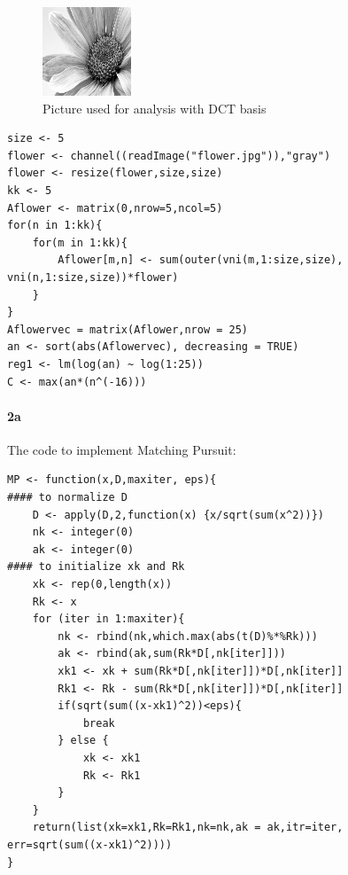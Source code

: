 \documentclass[12pt, leqno]{article}
\begin{document}
\begin{figure}
\centering
  \includegraphics[scale=1]{flower.png}
\caption{Picture used for analysis with DCT basis}
\label{flower}
\end{figure}

\begin{verbatim}
size <- 5
flower <- channel((readImage("flower.jpg")),"gray")
flower <- resize(flower,size,size)
kk <- 5
Aflower <- matrix(0,nrow=5,ncol=5)
for(n in 1:kk){
    for(m in 1:kk){
        Aflower[m,n] <- sum(outer(vni(m,1:size,size),
vni(n,1:size,size))*flower)
    }
}
Aflowervec = matrix(Aflower,nrow = 25)
an <- sort(abs(Aflowervec), decreasing = TRUE)
reg1 <- lm(log(an) ~ log(1:25))
C <- max(an*(n^(-16)))
\end{verbatim}

\paragraph{2a}
The code to implement Matching Pursuit:
\begin{verbatim}
MP <- function(x,D,maxiter, eps){
#### to normalize D
    D <- apply(D,2,function(x) {x/sqrt(sum(x^2))})
    nk <- integer(0)
    ak <- integer(0)
#### to initialize xk and Rk
    xk <- rep(0,length(x))
    Rk <- x
    for (iter in 1:maxiter){
        nk <- rbind(nk,which.max(abs(t(D)%*%Rk)))
        ak <- rbind(ak,sum(Rk*D[,nk[iter]]))
        xk1 <- xk + sum(Rk*D[,nk[iter]])*D[,nk[iter]]
        Rk1 <- Rk - sum(Rk*D[,nk[iter]])*D[,nk[iter]]
        if(sqrt(sum((x-xk1)^2))<eps){
            break
        } else {
            xk <- xk1
            Rk <- Rk1
        }        
    }
    return(list(xk=xk1,Rk=Rk1,nk=nk,ak = ak,itr=iter,
err=sqrt(sum((x-xk1)^2))))
}
\end{verbatim}
\end{document}

